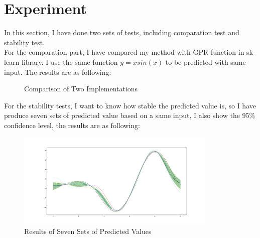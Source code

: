 \documentclass{article} %
\begin{document}
\section{Experiment}
In this section, I have done two sets of tests, including comparation test and stability test.\\

For the comparation part, I have compared my method with GPR function in sk-learn library. I use the same function $y=xsin(x)$ to be predicted with same input. The results are as following:
\begin{figure}[H]
	\centering
	\caption{Comparison of Two Implementations}
	\label{fig1}
\end{figure}
For the stability tests, I want to know how stable the predicted value is, so I have produce seven sets of predicted value based on a same input, I also show the 95\% confidence level, the results are as following:
 \begin{figure}[H]
	\begin{center}
		\includegraphics[width=0.85\textwidth]{stability}
	\end{center}
	\caption{Results of Seven Sets of Predicted Values }
	\label{fig2}
\end{figure}
\end{document}
